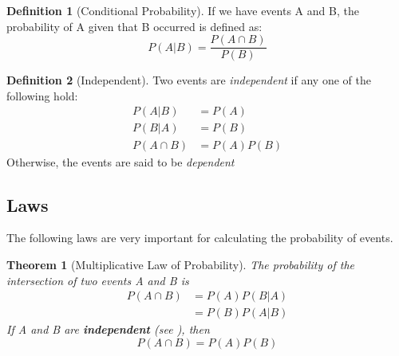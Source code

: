 \documentclass{article}
\theoremstyle{plain}
\newtheorem{thm}{Theorem}[section]
\theoremstyle{definition}
\newtheorem{defn}{Definition}[section]
\newtheorem{example}{Example}[section]
\theoremstyle{remark}
\begin{document}

\begin{defn}[Conditional Probability] 
If we have events A and B, the probability of A given that B occurred is defined as:
$$
P(A|B) = \frac{P(A \cap B)}{P(B)}
$$
\end{defn}

\begin{defn}[Independent] 
Two events are \textit{independent} if any one of the following hold:
\begin{align*}
P(A|B) &= P(A)\\
P(B|A) &= P(B)\\
P(A \cap B) &= P(A)P(B)
\end{align*}
Otherwise, the events are said to be \textit{dependent}
\end{defn}

\subsection{Laws}
The following laws are very important for calculating the probability of events.
\begin{thm}[Multiplicative Law of Probability] 
The probability of the intersection of two events A and B is
\begin{align*}
P(A \cap B) &= P(A)P(B|A)\\
&= P(B)P(A|B)
\end{align*}
If A and B are \textbf{independent} (see ), then
$$
P(A \cap B) = P(A)P(B)
$$
\end{thm}
\end{document}
